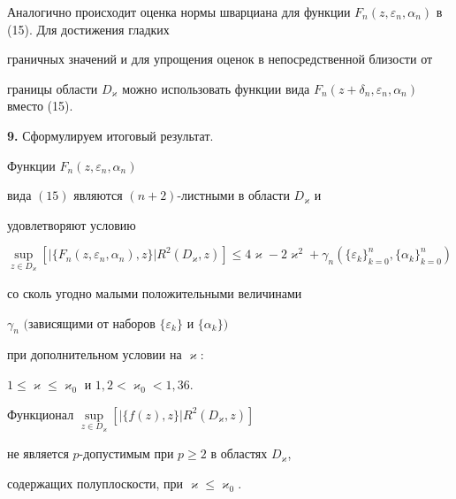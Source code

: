 Аналогично происходит оценка нормы шварциана для функции $F_{n} (


{z,\varepsilon_{n},\alpha_{n}} )$ в (15). Для достижения гладких 


граничных значений и для упрощения оценок в непосредственной близости от 


границы области $D_{\varkappa} $ можно использовать функции вида $F_{n} (


{z+\delta_{n},\varepsilon_{n},\alpha_{n}} )$ вместо (15).


\medskip





{\bf 9.} Сформулируем итоговый результат.








\begin{thmnonum}


Функции $F_{n} ({z,\varepsilon_{n},\alpha_{n}})$


вида $(15)$ являются $(n+2)$-листными в области $D_{\varkappa} $ и 


удовлетворяют условию


$$


\sup_{z \in D_{\varkappa}} [{|\{F_{n} (


{z,\varepsilon_{n},\alpha_{n}} ),z\} |


R^2({D_{\varkappa},z})} ] \le 


4\varkappa-2\varkappa^2+\gamma_{n}


({\{\varepsilon_{k} \}_{k=0}^{n},\{\alpha_{k} \}_{k=0}^{n} })


$$


со сколь угодно малыми положительными величинами 


$\gamma_n$ $($зависящими от наборов $\{\varepsilon_k\}$ и $\{\alpha_k\})$


при дополнительном условии на $\varkappa{:}$


$1 \le \varkappa \le \varkappa_0 $ и $1{,}2 < \varkappa_0 < 1{,}36$.


\end{thmnonum}








\begin{cornonum}


Функционал $\sup\limits_{z \in D_{\varkappa}} 


[{|\{f(z),z\} |R^2({D_{\varkappa},z})}]$


не является $p$-допустимым при $p \ge 2$ в областях $D_{\varkappa}$,


содержащих полуплоскости, при $\varkappa \le \varkappa_0$.


\end{cornonum}









